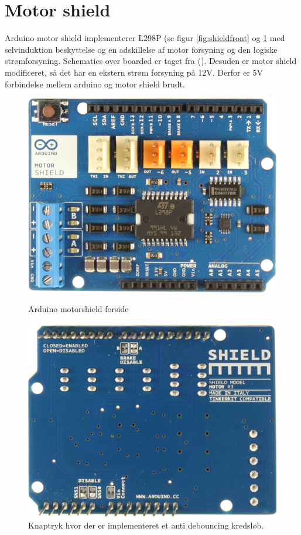 \section{Motor shield}
Arduino motor shield implementerer L298P (se figur \ref{fig:shieldfront} og \ref{fig:shieldback} med selvinduktion beskyttelse og en adskillelse af motor forsyning og den logiske strømforsyning. Schematics over boarded er taget fra (\cite{Manual:3}). Desuden er motor shield modificeret, så det har en ekstern strøm forsyning på 12V. Derfor er 5V forbindelse mellem arduino og motor shield brudt.
\begin{figure}[H]
	\begin{minipage}{0.5\textwidth}
		\includegraphics[width = \textwidth]{Implementeringsdokument/billeder/shieldforside.png}
		\caption{Arduino motorshield forside}\label{fig:shieldfront}
	\end{minipage}
	\begin{minipage}{0.5\textwidth}
		\includegraphics[width = \textwidth]{Implementeringsdokument/billeder/shieldbagside.png}
		\caption{Knaptryk hvor der er implementeret et anti debouncing kredsløb.}\label{fig:shieldback}
	\end{minipage}
\end{figure}

\label{lastPage}